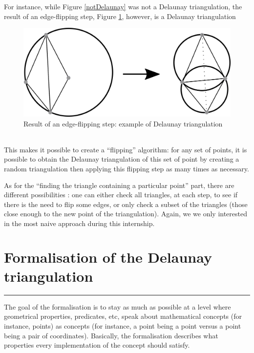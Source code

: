 \documentclass[a4paper,10pt]{article}
\begin{document}
For instance, while Figure \ref{notDelaunay} was not a Delaunay triangulation, the result of an edge-flipping step, Figure \ref{DelaunayTriangulation}, however, is a Delaunay triangulation
\begin{figure}
\centering
\includegraphics[scale=1]{dessin1}
\caption{\label{DelaunayTriangulation} Result of an edge-flipping step: example of Delaunay triangulation}
\end{figure}\\
This makes it possible to create a ``flipping'' algorithm: for any set of points, it is possible to obtain the Delaunay triangulation of this set of point by creating a random triangulation then applying this flipping step as many times as necessary.

As for the ``finding the triangle containing a particular point'' part, there are different possibilities : one can either check all triangles, at each step, to see if there is the need to flip some edges, or only check a subset of the triangles (those close enough to the new point of the triangulation). Again, we we only interested in the most naive approach during this internship.
\section{Formalisation of the Delaunay triangulation}
\rule{\linewidth}{0.5pt}

The goal of the formalisation is to stay as much as possible at a level where geometrical properties, predicates, etc, speak about mathematical concepts (for instance, points) as concepts (for instance, a point being a point versus a point being a pair of coordinates). Basically, the formalisation describes what properties every implementation of the concept should satisfy.
\end{document}
